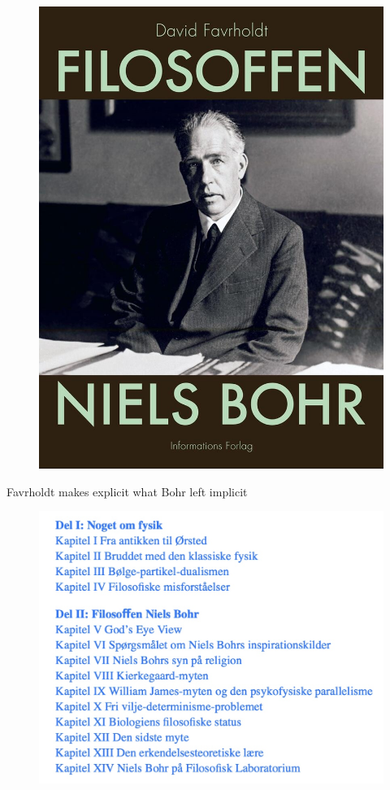 \documentclass[ignorenonframetext, ]{beamer}
\begin{document}
\begin{frame}

\begin{figure}
\centering
\includegraphics[scale=0.28]{filosoffen.jpg}
\end{figure}
\end{frame}

\begin{frame}{Favrholdt makes explicit what Bohr left implicit}

\begin{figure}
  \centering \includegraphics[scale=0.5]{indhold.jpg}
\end{figure}
\end{frame}
\end{document}
